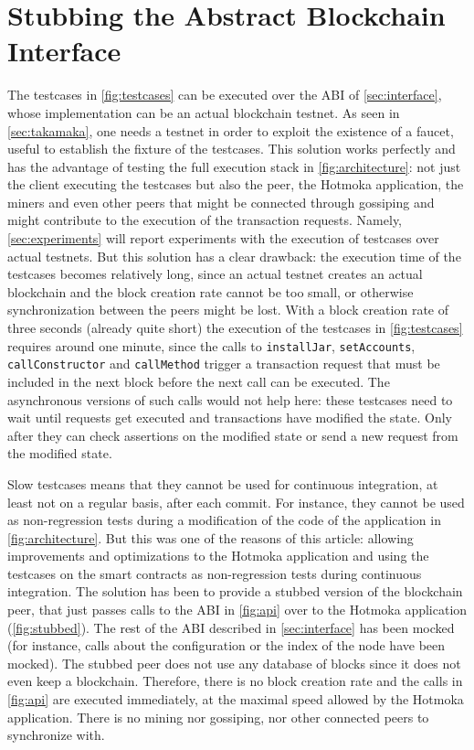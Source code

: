 \section{Stubbing the Abstract Blockchain Interface}\label{sec:stubbing}

The testcases in \cref{fig:testcases} can be executed over the ABI
of \cref{sec:interface}, whose implementation can
be an actual blockchain testnet. As seen in \cref{sec:takamaka},
one needs a testnet in order to exploit the
existence of a faucet, useful to establish the fixture of the testcases.
This solution works perfectly and has the advantage of testing the full
execution stack in \cref{fig:architecture}: not just the client executing
the testcases but also the peer, the Hotmoka application, the miners and even
other peers that might be connected through gossiping and might contribute
to the execution of the transaction requests. Namely, \cref{sec:experiments}
will report experiments with the execution of testcases over actual
testnets. But this solution has a clear drawback: the execution time
of the testcases becomes relatively long, since an actual testnet
creates an actual blockchain and the block creation rate cannot be
too small, or otherwise synchronization between the peers might be lost.
With a block creation rate of three seconds (already quite short) the
execution of the testcases in \cref{fig:testcases} requires around one minute,
since the calls to \texttt{installJar}, \texttt{setAccounts},
\texttt{callConstructor} and \texttt{callMethod} trigger a transaction request
that must be included in the next block before the next call can be executed.
The asynchronous versions of such calls would not help here: these testcases
need to wait until requests get executed and transactions have modified
the state. Only after they can check assertions on the modified state or send
a new request from the modified state.

Slow testcases means that they cannot be used for continuous integration,
at least not on a regular basis, after each commit. For instance,
they cannot be used as non-regression tests during a modification of
the code of the application in \cref{fig:architecture}. But this was one
of the reasons of this article: allowing improvements and optimizations to
the Hotmoka application and using the testcases on the smart contracts
as non-regression tests during continuous integration.
The solution has been to provide a stubbed version of the blockchain peer,
that just passes calls to the ABI in \cref{fig:api}
over to the Hotmoka application (\cref{fig:stubbed}).
The rest of the ABI described
in \cref{sec:interface} has been mocked (for instance,
calls about the configuration or the
index of the node have been mocked). The stubbed peer does not use any database of blocks since
it does not even keep a blockchain. Therefore, there is no block
creation rate and the calls in \cref{fig:api} are executed immediately,
at the maximal speed allowed by the Hotmoka application.
There is no mining nor gossiping, nor other connected peers to synchronize with.

